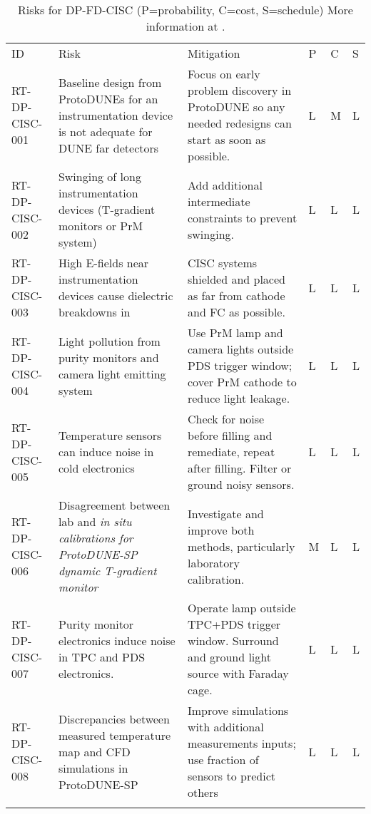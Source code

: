 
\begin{footnotesize}
\begin{longtable}{P{0.18\textwidth}P{0.20\textwidth}P{0.32\textwidth}P{0.02\textwidth}P{0.02\textwidth}P{0.02\textwidth}} 
\caption[DP CISC risks]{Risks for DP-FD-CISC (P=probability, C=cost, S=schedule) More information at . } \\
ID & Risk & Mitigation & P & C & S  \\  \colhline
RT-DP-CISC-001 & Baseline design from ProtoDUNEs for an instrumentation device is not adequate for DUNE far detectors & Focus on early problem discovery in ProtoDUNE so any needed redesigns can start as soon as possible. & L & M & L \\  \colhline
RT-DP-CISC-002 & Swinging of long instrumentation devices (T-gradient monitors or PrM system) & Add additional intermediate constraints to prevent swinging. & L & L & L \\  \colhline
RT-DP-CISC-003 & High E-fields near instrumentation devices cause dielectric breakdowns in  & CISC systems shielded and placed as far from cathode and FC as possible. & L & L & L \\  \colhline
RT-DP-CISC-004 & Light pollution from purity monitors and camera light emitting system & Use PrM lamp and camera lights outside PDS trigger window; cover PrM cathode to reduce light leakage. & L & L & L \\  \colhline
RT-DP-CISC-005 & Temperature sensors can induce noise in cold electronics & Check for noise before filling and remediate, repeat after filling. Filter or ground noisy sensors. & L & L  & L \\  \colhline
RT-DP-CISC-006 & Disagreement between lab and \em{in situ} calibrations for ProtoDUNE-SP dynamic T-gradient monitor & Investigate and improve both methods, particularly laboratory calibration. & M & L & L \\  \colhline
RT-DP-CISC-007 & Purity monitor electronics induce noise in TPC and PDS electronics. & Operate lamp outside TPC+PDS trigger window. Surround and ground light source with Faraday cage. & L & L & L \\  \colhline
RT-DP-CISC-008 & Discrepancies between measured temperature map and CFD simulations in ProtoDUNE-SP & Improve simulations with additional measurements inputs; use fraction of sensors to predict others   & L & L & L \\  \colhline

\end{longtable}
\end{footnotesize}
